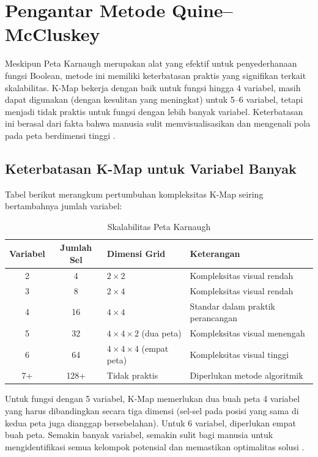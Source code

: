 \section{Pengantar Metode Quine--McCluskey}

Meskipun Peta Karnaugh merupakan alat yang efektif untuk penyederhanaan fungsi Boolean, metode ini memiliki keterbatasan praktis yang signifikan terkait skalabilitas. K-Map bekerja dengan baik untuk fungsi hingga 4 variabel, masih dapat digunakan (dengan kesulitan yang meningkat) untuk 5--6 variabel, tetapi menjadi tidak praktis untuk fungsi dengan lebih banyak variabel. Keterbatasan ini berasal dari fakta bahwa manusia sulit memvisualisasikan dan mengenali pola pada peta berdimensi tinggi \cite{rosen2019,saylor_cs202}.

\subsection{Keterbatasan K-Map untuk Variabel Banyak}

Tabel berikut merangkum pertumbuhan kompleksitas K-Map seiring bertambahnya jumlah variabel:

\begin{table}[H]
\centering
\renewcommand{\arraystretch}{1.3}
\small
\begin{tabular}{|c|c|>{\raggedright\arraybackslash}p{3.2cm}|>{\raggedright\arraybackslash}p{4.4cm}|}
\hline
\textbf{Variabel} & \textbf{Jumlah Sel} & \textbf{Dimensi Grid} & \textbf{Keterangan} \\ \hline
2 & 4 & $2 \times 2$ & Kompleksitas visual rendah \\ \hline
3 & 8 & $2 \times 4$ & Kompleksitas visual rendah \\ \hline
4 & 16 & $4 \times 4$ & Standar dalam praktik perancangan \\ \hline
5 & 32 & $4 \times 4 \times 2$ (dua peta) & Kompleksitas visual menengah \\ \hline
6 & 64 & $4 \times 4 \times 4$ (empat peta) & Kompleksitas visual tinggi \\ \hline
7+ & 128+ & Tidak praktis & Diperlukan metode algoritmik \\ \hline
\end{tabular}
\normalsize
\caption{Skalabilitas Peta Karnaugh}
\label{tab:skalabilitas-kmap}
\end{table}

Untuk fungsi dengan 5 variabel, K-Map memerlukan dua buah peta 4 variabel yang harus dibandingkan secara tiga dimensi (sel-sel pada posisi yang sama di kedua peta juga dianggap bersebelahan). Untuk 6 variabel, diperlukan empat buah peta. Semakin banyak variabel, semakin sulit bagi manusia untuk mengidentifikasi semua kelompok potensial dan memastikan optimalitas solusi \cite{wiki_karnaugh}.

